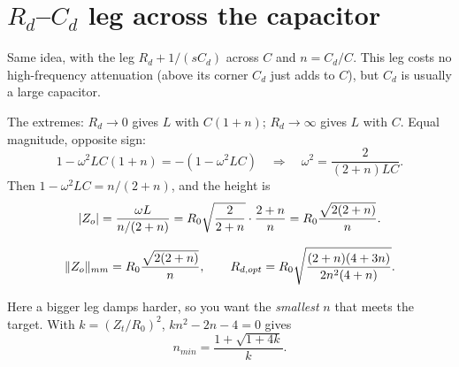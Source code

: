 
\section{\texorpdfstring{$R_d$--$C_d$}{Rd-Cd} leg across the capacitor}
\label{sec:rd-cd}

Same idea, with the leg $R_d + 1/(sC_d)$ across $C$ and $n = C_d/C$.
This leg costs no high-frequency attenuation (above its corner $C_d$ just adds
to $C$), but $C_d$ is usually a large capacitor.

\begin{derivation}
	The extremes: $R_d \to 0$ gives $L$ with $C(1+n)$; $R_d \to \infty$ gives
	$L$ with $C$. Equal magnitude, opposite sign:
	\[
		1 - \omega^2 LC(1+n) = -(1 - \omega^2 LC)
		\quad\Rightarrow\quad
		\omega^2 = \frac{2}{(2+n)LC}.
	\]
	Then $1 - \omega^2 LC = n/(2+n)$, and the height is
	\[
		\lvert Z_o\rvert = \frac{\omega L}{n/(2+n)} = R_0\sqrt{\frac{2}{2+n}}\cdot\frac{2+n}{n}
		= R_0\frac{\sqrt{2(2+n)}}{n}.
	\]
\end{derivation}

\begin{equation}\label{eq:rd-cd-opt}
	\lVert Z_o\rVert_{mm} = R_0\frac{\sqrt{2(2+n)}}{n}, \qquad
	R_{d,opt} = R_0\sqrt{\frac{(2+n)(4+3n)}{2n^2(4+n)}}.
\end{equation}

Here a bigger leg damps harder, so you want the \emph{smallest} $n$ that
meets the target. With $k = (Z_t/R_0)^2$, $kn^2 - 2n - 4 = 0$ gives
\[
	n_{min} = \frac{1 + \sqrt{1 + 4k}}{k}.
\]

